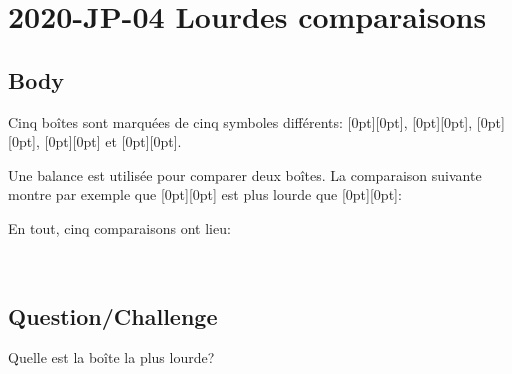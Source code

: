 \documentclass[a4paper,11pt]{report}
\newcommand{\taskGraphicsFolder}{..}
\begin{document}
\section*{\centering{} 2020-JP-04 Lourdes comparaisons}


\subsection*{Body}

Cinq boîtes sont marquées de cinq symboles différents: \raisebox{-0.5ex}[0pt][0pt]{}, \raisebox{-0.5ex}[0pt][0pt]{}, \raisebox{-0.5ex}[0pt][0pt]{}, \raisebox{-0.5ex}[0pt][0pt]{} et \raisebox{-0.5ex}[0pt][0pt]{}.

Une balance est utilisée pour comparer deux boîtes. La comparaison suivante montre par exemple que \raisebox{-0.5ex}[0pt][0pt]{} est plus lourde que \raisebox{-0.5ex}[0pt][0pt]{}:

{\centering%
\par}

En tout, cinq comparaisons ont lieu:

{\centering%
\raisebox{-0.5ex}{}~~
\raisebox{-0.5ex}{}~~
\raisebox{-0.5ex}{}~~
\raisebox{-0.5ex}{}~~
\raisebox{-0.5ex}{}\par}

{\em

\subsection*{Question/Challenge}

Quelle est la boîte la plus lourde?

}\begingroup
\renewcommand{\arraystretch}{1.5}
\end{document}
